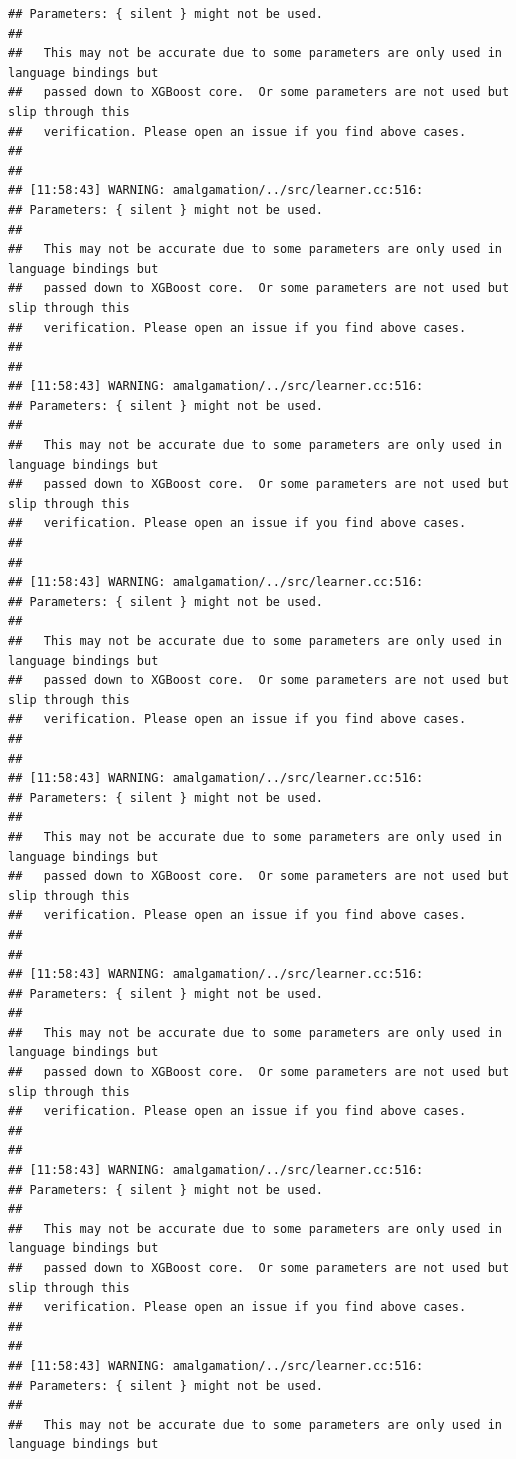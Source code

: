 \documentclass[AMS,STIX2COL]{WileyNJD-v2}\usepackage[]{graphicx}\usepackage[]{color}
\makeatletter
\newenvironment{kframe}{%
 \def\at@end@of@kframe{}%
 \ifinner\ifhmode%
  \def\at@end@of@kframe{\end{minipage}}%
  \begin{minipage}{\columnwidth}%
 \fi\fi%
 \def\FrameCommand##1{\hskip\@totalleftmargin \hskip-\fboxsep
 \colorbox{shadecolor}{##1}\hskip-\fboxsep
     \hskip-\linewidth \hskip-\@totalleftmargin \hskip\columnwidth}%
 \MakeFramed {\advance\hsize-\width
   \@totalleftmargin\z@ \linewidth\hsize
   \@setminipage}}%
 {\par\unskip\endMakeFramed%
 \at@end@of@kframe}
\newenvironment{knitrout}{}{} %
\makeatother
\begin{document}
\begin{knitrout}
\begin{kframe}
\begin{verbatim}
## Parameters: { silent } might not be used.
## 
##   This may not be accurate due to some parameters are only used in language bindings but
##   passed down to XGBoost core.  Or some parameters are not used but slip through this
##   verification. Please open an issue if you find above cases.
## 
## 
## [11:58:43] WARNING: amalgamation/../src/learner.cc:516: 
## Parameters: { silent } might not be used.
## 
##   This may not be accurate due to some parameters are only used in language bindings but
##   passed down to XGBoost core.  Or some parameters are not used but slip through this
##   verification. Please open an issue if you find above cases.
## 
## 
## [11:58:43] WARNING: amalgamation/../src/learner.cc:516: 
## Parameters: { silent } might not be used.
## 
##   This may not be accurate due to some parameters are only used in language bindings but
##   passed down to XGBoost core.  Or some parameters are not used but slip through this
##   verification. Please open an issue if you find above cases.
## 
## 
## [11:58:43] WARNING: amalgamation/../src/learner.cc:516: 
## Parameters: { silent } might not be used.
## 
##   This may not be accurate due to some parameters are only used in language bindings but
##   passed down to XGBoost core.  Or some parameters are not used but slip through this
##   verification. Please open an issue if you find above cases.
## 
## 
## [11:58:43] WARNING: amalgamation/../src/learner.cc:516: 
## Parameters: { silent } might not be used.
## 
##   This may not be accurate due to some parameters are only used in language bindings but
##   passed down to XGBoost core.  Or some parameters are not used but slip through this
##   verification. Please open an issue if you find above cases.
## 
## 
## [11:58:43] WARNING: amalgamation/../src/learner.cc:516: 
## Parameters: { silent } might not be used.
## 
##   This may not be accurate due to some parameters are only used in language bindings but
##   passed down to XGBoost core.  Or some parameters are not used but slip through this
##   verification. Please open an issue if you find above cases.
## 
## 
## [11:58:43] WARNING: amalgamation/../src/learner.cc:516: 
## Parameters: { silent } might not be used.
## 
##   This may not be accurate due to some parameters are only used in language bindings but
##   passed down to XGBoost core.  Or some parameters are not used but slip through this
##   verification. Please open an issue if you find above cases.
## 
## 
## [11:58:43] WARNING: amalgamation/../src/learner.cc:516: 
## Parameters: { silent } might not be used.
## 
##   This may not be accurate due to some parameters are only used in language bindings but

\end{verbatim}
\end{kframe}
\end{knitrout}
\end{document}
